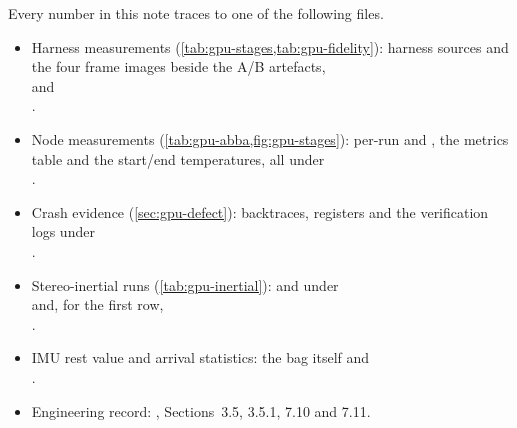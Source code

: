\documentclass[11pt,a4paper,notitlepage]{report}
\begin{document}
Every number in this note traces to one of the following files.
\begin{itemize}
\item Harness measurements (\cref{tab:gpu-stages,tab:gpu-fidelity}): harness
  sources and the four frame images beside the A/B artefacts,\\
   and\\
  .
\item Node measurements (\cref{tab:gpu-abba,fig:gpu-stages}): per-run
   and , the metrics table
  and the start/end temperatures, all under\\
  .
\item Crash evidence (\cref{sec:gpu-defect}): backtraces, registers and the
  verification logs under\\
  .
\item Stereo-inertial runs (\cref{tab:gpu-inertial}):  and
   under\\
   and, for the first row,\\
  .
\item IMU rest value and arrival statistics: the bag itself and\\
  .
\item Engineering record: ,
  Sections~3.5, 3.5.1, 7.10 and 7.11.
\end{itemize}
\end{document}
